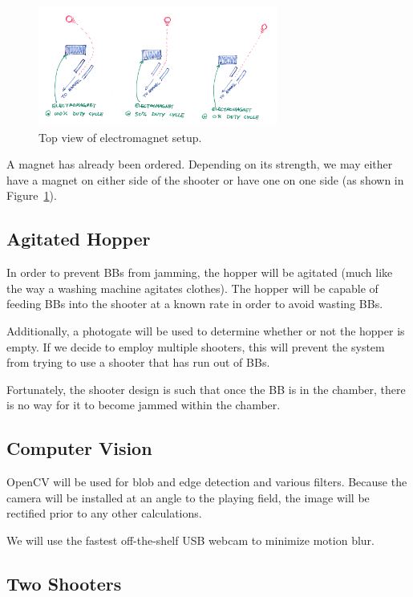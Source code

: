 \documentclass[10pt,letterpaper]{article}
\begin{document}
\begin{figure}[!h]
	\centering
	\includegraphics[width=0.7\textwidth]{electromagnet_top.png}
	\caption{Top view of electromagnet setup.}
	\label{fig:em}
\end{figure}

A magnet has already been ordered. Depending on its strength, we may either
have a magnet on either side of the shooter or have one on one side (as shown
in Figure~\ref{fig:em}).

\subsection*{Agitated Hopper}

In order to prevent BBs from jamming, the hopper will be agitated (much like
the way a washing machine agitates clothes). The hopper will be capable of
feeding BBs into the shooter at a known rate in order to avoid wasting BBs.

Additionally, a photogate will be used to determine whether or not the hopper
is empty. If we decide to employ multiple shooters, this will prevent the
system from trying to use a shooter that has run out of BBs.

Fortunately, the shooter design is such that once the BB is in the chamber,
there is no way for it to become jammed within the chamber.


\subsection*{Computer Vision}

OpenCV will be used for blob and edge detection and various filters. Because
the camera will be installed at an angle to the playing field, the image will
be rectified prior to any other calculations.

We will use the fastest off-the-shelf USB webcam to minimize motion blur.


\subsection*{Two Shooters}
\end{document}
